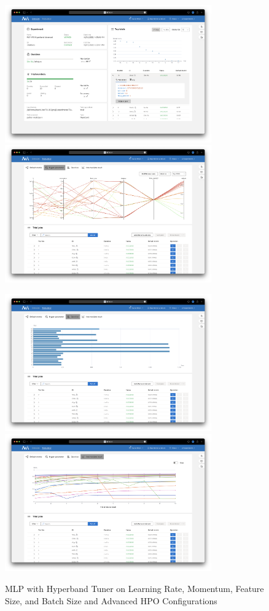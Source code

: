 \documentclass{article}
\begin{document}
\begin{figure}
    \centerline{\includegraphics[width=3.5in]{../proj3/figures/mlp_hyperband_batch_advanced_overview.png}\includegraphics[width=3.5in]{../proj3/figures/mlp_hyperband_batch_advanced_hyperparameter.png}}
    \centerline{\includegraphics[width=3.5in]{../proj3/figures/mlp_hyperband_batch_advanced_latency.png}\includegraphics[width=3.5in]{../proj3/figures/mlp_hyperband_batch_advanced_intermediate.png}}
    \caption{MLP with Hyperband Tuner on Learning Rate, Momentum, Feature Size, and Batch Size and Advanced HPO Configurations}
    \label{fig:mlp-hyperband-batch-advanced}
\end{figure}
\end{document}
